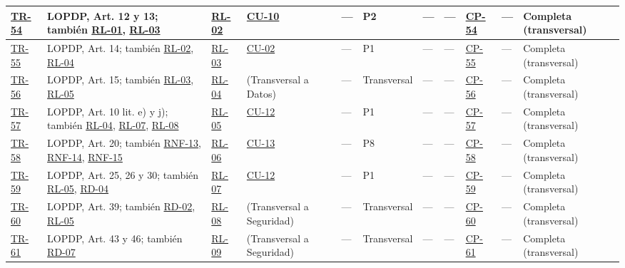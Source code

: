 \documentclass[journal,onecolumn]{IEEEtran}
\begin{document}
\begin{landscape}
\begin{longtable}{@{}p{0.8cm} p{4.0cm} p{1.3cm} p{1.7cm} p{2.5cm} p{1.0cm} p{1.9cm} p{0.9cm} p{0.9cm} p{1.75cm} p{2.2cm}@{}}
			\hyperref[tr:54]{TR-54}\label{tr:54} & LOPDP, Art. 12 y 13; también \hyperref[rl:01]{RL-01}, \hyperref[rl:03]{RL-03} & \hyperref[rl:02]{RL-02} & \hyperref[tab:CU-10]{CU-10} & --- & P2 & --- & --- & \hyperref[cp:54]{CP-54} & --- & Completa (transversal) \\ \midrule
			\hyperref[tr:55]{TR-55}\label{tr:55} & LOPDP, Art. 14; también \hyperref[rl:02]{RL-02}, \hyperref[rl:04]{RL-04} & \hyperref[rl:03]{RL-03} & \hyperref[tab:CU-02]{CU-02} & --- & P1 & --- & --- & \hyperref[cp:55]{CP-55} & --- & Completa (transversal) \\ \midrule
			\hyperref[tr:56]{TR-56}\label{tr:56} & LOPDP, Art. 15; también \hyperref[rl:03]{RL-03}, \hyperref[rl:05]{RL-05} & \hyperref[rl:04]{RL-04} & (Transversal a Datos) & --- & Transversal & --- & --- & \hyperref[cp:56]{CP-56} & --- & Completa (transversal) \\ \midrule
			\hyperref[tr:57]{TR-57}\label{tr:57} & LOPDP, Art. 10 lit. e) y j); también \hyperref[rl:04]{RL-04}, \hyperref[rl:07]{RL-07}, \hyperref[rl:08]{RL-08} & \hyperref[rl:05]{RL-05} & \hyperref[tab:CU-12]{CU-12} & --- & P1 & --- & --- & \hyperref[cp:57]{CP-57} & --- & Completa (transversal) \\ \midrule
			\hyperref[tr:58]{TR-58}\label{tr:58} & LOPDP, Art. 20; también \hyperref[tab:RNF-13]{RNF-13}, \hyperref[tab:RNF-14]{RNF-14}, \hyperref[tab:RNF-15]{RNF-15} & \hyperref[rl:06]{RL-06} & \hyperref[tab:CU-13]{CU-13} & --- & P8 & --- & --- & \hyperref[tab:CP-58]{CP-58} & --- & Completa (transversal) \\ \midrule
			\hyperref[tr:59]{TR-59}\label{tr:59} & LOPDP, Art. 25, 26 y 30; también \hyperref[rl:05]{RL-05}, \hyperref[tab:RD-04]{RD-04} & \hyperref[rl:07]{RL-07} & \hyperref[tab:CU-12]{CU-12} & --- & P1 & --- & --- & \hyperref[cp:59]{CP-59} & --- & Completa (transversal) \\ \midrule
			\hyperref[tr:60]{TR-60}\label{tr:60} & LOPDP, Art. 39; también \hyperref[tab:RD-02]{RD-02}, \hyperref[rl:05]{RL-05} & \hyperref[rl:08]{RL-08} & (Transversal a Seguridad) & --- & Transversal & --- & --- & \hyperref[cp:60]{CP-60} & --- & Completa (transversal) \\ \midrule
			\hyperref[tr:61]{TR-61}\label{tr:61} & LOPDP, Art. 43 y 46; también \hyperref[tab:RD-07]{RD-07} & \hyperref[rl:09]{RL-09} & (Transversal a Seguridad) & --- & Transversal & --- & --- & \hyperref[cp:61]{CP-61} & --- & Completa (transversal) \\ \midrule

	\end{longtable}
\end{landscape}
\end{document}
